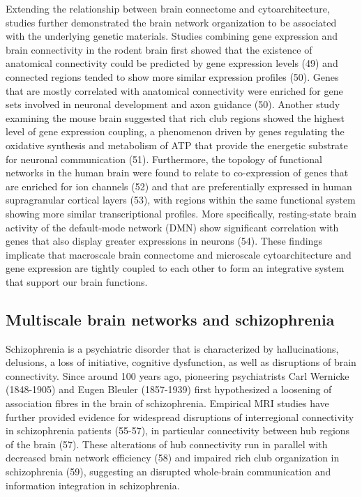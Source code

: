 \begin{refsection}
Extending the relationship between brain connectome and cytoarchitecture, studies further demonstrated the brain network organization to be associated with the underlying genetic materials. Studies combining gene expression and brain connectivity in the rodent brain first showed that the existence of anatomical connectivity could be predicted by gene expression levels (49) and connected regions tended to show more similar expression profiles (50). Genes that are mostly correlated with anatomical connectivity were enriched for gene sets involved in neuronal development and axon guidance (50). Another study examining the mouse brain suggested that rich club regions showed the highest level of gene expression coupling, a phenomenon driven by genes regulating the oxidative synthesis and metabolism of ATP that provide the energetic substrate for neuronal communication (51). Furthermore, the topology of functional networks in the human brain were found to relate to co-expression of genes that are enriched for ion channels (52) and that are preferentially expressed in human supragranular cortical layers (53), with regions within the same functional system showing more similar transcriptional profiles. More specifically, resting-state brain activity of the default-mode network (DMN) show significant correlation with genes that also display greater expressions in neurons (54). These findings implicate that macroscale brain connectome and microscale cytoarchitecture and gene expression are tightly coupled to each other to form an integrative system that support our brain functions.

\subsection*{Multiscale brain networks and schizophrenia}
Schizophrenia is a psychiatric disorder that is characterized by hallucinations, delusions, a loss of initiative, cognitive dysfunction, as well as disruptions of brain connectivity. Since around 100 years ago, pioneering psychiatrists Carl Wernicke (1848-1905) and Eugen Bleuler (1857-1939) first hypothesized a loosening of association fibres in the brain of schizophrenia. Empirical MRI studies have further provided evidence for widespread disruptions of interregional connectivity in schizophrenia patients (55-57), in particular connectivity between hub regions of the brain (57). These alterations of hub connectivity run in parallel with decreased brain network efficiency (58) and impaired rich club organization in schizophrenia (59), suggesting an disrupted whole-brain communication and information integration in schizophrenia.


\end{refsection}
